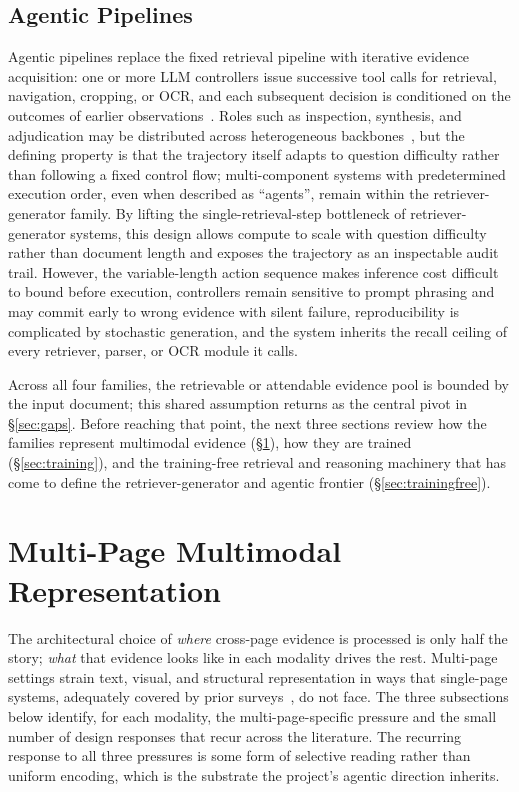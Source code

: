 \documentclass[11pt]{article}
\begin{document}
\subsection{Agentic Pipelines}
Agentic pipelines replace the fixed retrieval pipeline with iterative evidence acquisition: one or more LLM controllers issue successive tool calls for retrieval, navigation, cropping, or OCR, and each subsequent decision is conditioned on the outcomes of earlier observations~\cite{zheng2026docvstar,sun2025docagent}. Roles such as inspection, synthesis, and adjudication may be distributed across heterogeneous backbones~\cite{yu2025mact,wang2025vidorag}, but the defining property is that the trajectory itself adapts to question difficulty rather than following a fixed control flow; multi-component systems with predetermined execution order, even when described as ``agents'', remain within the retriever-generator family. By lifting the single-retrieval-step bottleneck of retriever-generator systems, this design allows compute to scale with question difficulty rather than document length and exposes the trajectory as an inspectable audit trail. However, the variable-length action sequence makes inference cost difficult to bound before execution, controllers remain sensitive to prompt phrasing and may commit early to wrong evidence with silent failure, reproducibility is complicated by stochastic generation, and the system inherits the recall ceiling of every retriever, parser, or OCR module it calls.

Across all four families, the retrievable or attendable evidence pool is bounded by the input document; this shared assumption returns as the central pivot in \S\ref{sec:gaps}. Before reaching that point, the next three sections review how the families represent multimodal evidence (\S\ref{sec:modalities}), how they are trained (\S\ref{sec:training}), and the training-free retrieval and reasoning machinery that has come to define the retriever-generator and agentic frontier (\S\ref{sec:trainingfree}).

\section{Multi-Page Multimodal Representation}
\label{sec:modalities}

The architectural choice of \emph{where} cross-page evidence is processed is only half the story; \emph{what} that evidence looks like in each modality drives the rest. Multi-page settings strain text, visual, and structural representation in ways that single-page systems, adequately covered by prior surveys~\cite{ding2025survey}, do not face. The three subsections below identify, for each modality, the multi-page-specific pressure and the small number of design responses that recur across the literature. The recurring response to all three pressures is some form of selective reading rather than uniform encoding, which is the substrate the project's agentic direction inherits.
\end{document}
